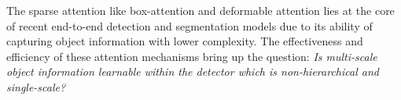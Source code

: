


The sparse attention like box-attention and deformable attention lies at the core of recent end-to-end detection and segmentation models due to its ability of capturing object information with lower complexity. The effectiveness and efficiency of these attention mechanisms bring up the question: \textit{Is multi-scale object information learnable within the detector which is non-hierarchical and single-scale?}
